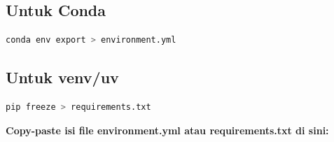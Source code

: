 \documentclass[11pt,a4paper]{article}
\begin{document}
\subsection{Untuk Conda}
\begin{lstlisting}[language=bash, caption=Export conda environment]
conda env export > environment.yml
\end{lstlisting}

\subsection{Untuk venv/uv}
\begin{lstlisting}[language=bash, caption=Export pip requirements]
pip freeze > requirements.txt
\end{lstlisting}

\textbf{Copy-paste isi file environment.yml atau requirements.txt di sini:}
\end{document}
